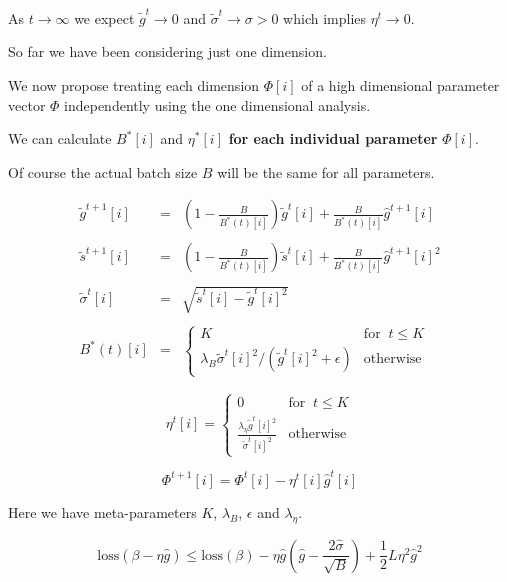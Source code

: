 {\vfill
As $t \rightarrow \infty$ we expect $\tilde{g}^t \rightarrow 0$ and $\tilde{\sigma}^t \rightarrow \sigma > 0$ which implies
$\eta^t \rightarrow 0$.


So far we have been considering just one dimension.

\vfill
We now propose treating each dimension $\Phi[i]$ of a high dimensional parameter vector $\Phi$ independently using the one dimensional analysis.

\vfill
We can calculate $B^*[i]$ and $\eta^*[i]$ {\bf for each individual parameter} $\Phi[i]$.

\vfill
Of course the actual batch size $B$ will be the same for all parameters.

\begin{eqnarray*}
  \tilde{g}^{t+1}[i] & = & \left(1-\frac{B}{B^*(t)[i]}\right)\tilde{g}^t[i] + \frac{B}{B^*(t)[i]} \hat{g}^{t+1}[i] \\
  \\
  \tilde{s}^{t+1}[i] & = & \left(1-\frac{B}{B^*(t)[i]}\right)\tilde{s}^t[i] + \frac{B}{B^*(t)[i]} \hat{g}^{t+1}[i]^2 \\
  \\
  \tilde{\sigma}^t[i] & = & \sqrt{\tilde{s}^t[i] - \tilde{g}^t[i]^2} \\
  \\
  B^*(t)[i] &= & \left\{\begin{array}{ll} K & \mbox{for}\;\; t \leq K \\
  \lambda_B\tilde{\sigma}^t[i]^2/(\tilde{g}^t[i]^2 + \epsilon) & \mbox{otherwise} \end{array}\right.
\end{eqnarray*}


$$\eta^t[i] = \left\{\begin{array}{ll} 0 & \mbox{for}\;\;t \leq K \\
        \frac{\lambda_\eta\tilde{g}^t[i]^2}{\tilde{\sigma}^t[i]^2} & \mbox{otherwise}
\end{array}\right.$$

\vfill
$$\Phi^{t+1}[i] = \Phi^t[i] - \eta^t[i] \hat{g}^t[i]$$

\vfill
Here we have meta-parameters $K$, $\lambda_B$, $\epsilon$ and $\lambda_\eta$.


$$\mathrm{loss}(\beta - \eta\hat{g}) \leq \mathrm{loss}(\beta) - \eta \hat{g}\left(\hat{g} - \frac{2\hat{\sigma}}{\sqrt{B}} \right)  + \frac{1}{2}L \eta^2 \hat{g}^2$$

}
